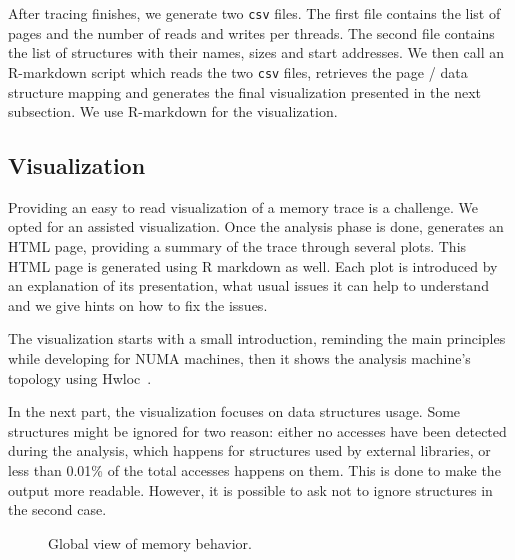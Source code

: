 After tracing finishes, we generate two \texttt{csv} files.
The first file contains the list of pages and the number of reads
and writes per threads. The second file contains the
list of structures with their names, sizes and start addresses.
We then call an R-markdown script which reads the two \texttt{csv} files,
retrieves the page / data structure mapping and generates the final
visualization presented in the next subsection. We use R-markdown
for the visualization.


\subsection{Visualization}
\label{sec:design-visu}

Providing an easy to read visualization of a memory trace is a challenge. We
opted for an assisted visualization. Once the analysis phase is done, \TABARNAC
generates an HTML page, providing a summary of the trace through several
plots. This HTML page is generated using R markdown as well. Each plot is
introduced by an explanation of its presentation, what usual issues it can
help to understand and we give hints on how to fix the issues.

The visualization starts with a small introduction, reminding the main
principles while developing for NUMA machines, then it shows the analysis
machine's topology using Hwloc~\cite{Broquedis10hwloc}.

In the next part, the visualization focuses on data structures usage. Some
structures might be ignored for two reason: either no accesses have been
detected during the analysis, which happens for structures used by external
libraries, or less than 0.01\% of the total accesses happens on them. This is
done to make the output more readable. However, it is possible to ask
\TABARNAC not to ignore structures in the second case.

\begin{figure}[htb]
    \centering
    \label{fig:example_plot1}
    \caption{Global view of memory behavior.}
\end{figure}

